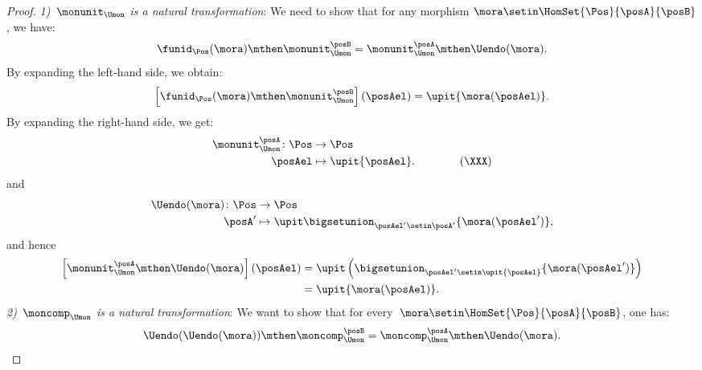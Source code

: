 \begin{proof}
    \emph{1)~$\monunit_{\Umon}$ is a natural transformation}:
    We need to show that for any morphism $\mora\setin \HomSet{\Pos}{\posA}{\posB}$, we have:
    \begin{equation}
        \funid_{\Pos}(\mora)\mthen \monunit_{\Umon}^\posB=\monunit_{\Umon}^\posA\mthen \Uendo(\mora).
    \end{equation}
    By expanding the left-hand side, we obtain:
    \begin{equation}
        \left[\funid_{\Pos}(\mora)\mthen \monunit_{\Umon}^\posB\right](\posAel)=\upit \{\mora(\posAel)\}.
    \end{equation}
    By expanding the right-hand side, we get:
    \begin{equation}
        \begin{aligned}
            \monunit_{\Umon}^\posA\colon \Pos & \to \Pos \\
            \posAel                           & \mapsto \upit \{\posAel\}.
            \qquad \qquad (\XXX)
        \end{aligned}
    \end{equation}
    and
    \begin{equation}
        \begin{aligned}
            \Uendo(\mora)\colon \Pos & \to \Pos \\
            \posA'                   & \mapsto \upit \bigsetunion_{\posAel'\setin \posA'}\{\mora(\posAel')\},
        \end{aligned}
    \end{equation}
    and hence
    \begin{equation}
        \begin{aligned}
            \left[\monunit_{\Umon}^\posA\mthen \Uendo(\mora)\right](\posAel) & =\upit \left( \bigsetunion_{\posAel'\setin \upit \{\posAel\}} \{\mora(\posAel')\}\right) \\
                                                                             & =\upit \{\mora(\posAel)\}.
        \end{aligned}
    \end{equation}
    \emph{2)~$\moncomp_{\Umon}$ is a natural transformation}:
    We want to show that for every~$\mora\setin \HomSet{\Pos}{\posA}{\posB}$, one has:
    \begin{equation}
        \Uendo(\Uendo(\mora))\mthen \moncomp_{\Umon}^{\posB}=\moncomp_{\Umon}^\posA \mthen \Uendo(\mora).

\end{equation}
\end{proof}
